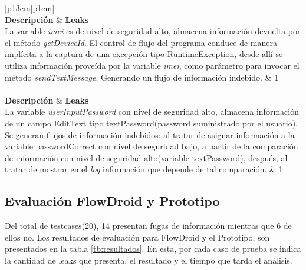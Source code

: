 \begin{table}[H]
\begin{tabular}{|p{13cm}|p{1cm}|}
	\hline
	\\
	\hline
	\textbf{Descripción} & \textbf{Leaks}\\
	\hline
	La variable \textit{imei} es de nivel de seguridad alto, almacena información
	devuelta por el método \textit{getDeviceId}. El control de flujo del
	programa conduce de manera implícita a la captura de una excepción tipo
	RuntimeException, desde allí se utiliza información proveída por la variable
	\textit{imei}, como parámetro para invocar el método \textit{sendTextMessage}.
	Generando un flujo de información indebido. & 1
	\\
	\hline
	\\
	\hline
	\textbf{Descripción} & \textbf{Leaks}\\
	\hline
	 La variable \textit{userInputPassword} con nivel de seguridad alto, almacena
	 información de un campo EditText tipo textPassword(password suministrado por
	 el usuario). Se generan flujos de información indebidos: al tratar de asignar
	 información a la variable passwordCorrect con nivel de seguridad bajo, a
	 partir de la comparación de información con nivel de seguridad alto(variable
	 textPassword), después, al tratar de mostrar en el \textit{log} información
	 que depende de tal comparación. & 1\\
	\hline
\end{tabular}
\caption{Descripción aplicaciones de prueba.\newline
Se considera con nivel de seguridad alto, variables y métodos que almacenan y
modifican(respectivamente), información catalogada como privada(Sources).\newline 
Se considera con nivel de seguridad bajo, canales para envío de mensajes,
muestra de logs y canales creados durante el control de flujo del programa.\newline }
\label{tab:descripApps0}
\end{table}

\subsection{Evaluación FlowDroid y Prototipo } 
\label{subsec:fvsp}
Del total de testcases(20), 14 presentan fugas de información mientras que 6 de
ellos no. Los resultados de evaluación para FlowDroid y el Prototipo, son
presentados en la tabla \ref{tb:resultados}. En esta, por cada caso de prueba
se indica la cantidad de leaks que presenta, el resultado y el tiempo que tarda el
análisis.

